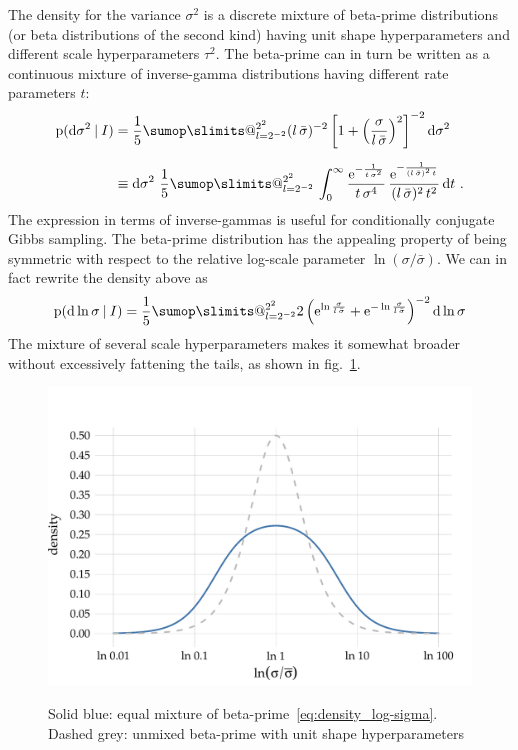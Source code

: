 \documentclass[\ifafour a4paper,12pt,\else a5paper,10pt,\fi%
onecolumn,oneside,article,%
british%
]{memoir}
\makeatletter
\theoremstyle{remark}
\theoremstyle{innote}
\def\sum{\DOTSI\sumop\slimits@}
\newcommand*{\e}{\ensuremath{\mathrm{e}}}
\newcommand*{\di}{\mathrm{d}}%
\newcommand*{\p}{\mathrm{p}}%
\renewcommand*{\|}[1][]{\nonscript\:#1\vert\nonscript\:\mathopen{}}
\newcommand*{\sect}{\S}%
\newcommand*{\fig}{fig.}%
\newcommand*{\sigmao}{\bar{\sigma}}
\makeatother
\begin{document}
\medskip

The density for the variance $\sigma^{2}$ is a discrete mixture of beta-prime distributions (or beta distributions of the second kind) \autocites[\sect\,25.7, 27.2]{johnsonetal1970b_r1995}{mcdonald1984} having unit shape hyperparameters and different scale hyperparameters $\tau^{2}$. The beta-prime can in turn be written as a continuous mixture of inverse-gamma distributions \autocites{dubey1970} having different rate parameters $t$:
\begin{equation}
  \label{eq:density_sigma}
  \begin{split}
    \p(\di\sigma^{2}\|I) &=
    \frac{1}{5}\sum_{l=2^{-2}}^{2^{2}}
    (l\,\sigmao)^{-2}\,\biggl[1+\Bigl(\frac{\sigma}{l\,\sigmao}\Bigr)^{2}\biggr]^{-2}
    \,\di\sigma^{2}
  \\[2\jot]
  &\equiv
    \di\sigma^{2}\ 
    \frac{1}{5}\sum_{l=2^{-2}}^{2^{2}}\,
    \int_{0}^{\infty}
    \frac{\e^{-\frac{1}{t\,\sigma^{2}}}}{
    t\,\sigma^{4}
  }\,
    \frac{\e^{-\frac{1}{(l\,\sigmao)^{2}\,t}}}{
    (l\,\sigmao)^{2}\,t^{2}
  }\,\di t \ .
\end{split}
\end{equation}
The expression in terms of inverse-gammas is useful for conditionally conjugate Gibbs sampling. The beta-prime distribution has the appealing property of being symmetric with respect to the relative log-scale parameter $\ln(\sigma/\sigmao)$. We can in fact rewrite the density above as
\begin{equation}
  \label{eq:density_log-sigma}
    \p(\di \ln\sigma\|I) =
    \frac{1}{5}\sum_{l=2^{-2}}^{2^{2}}
    2\,\Bigl(
    \e^{\ln\frac{\sigma}{l\,\sigmao}}
+    \e^{-\ln\frac{\sigma}{l\,\sigmao}}
    \Bigr)^{-2}\, \di\ln\sigma
\end{equation}
The mixture of several scale hyperparameters makes it somewhat broader without excessively fattening the tails, as shown in \fig~\ref{fig:betaprime}.
\begin{figure}
\centering\includegraphics[width=0.75\linewidth]{betaprime.pdf}\\
\caption{Solid blue: equal mixture of beta-prime~\eqref{eq:density_log-sigma}. Dashed grey: unmixed beta-prime with unit shape hyperparameters}\label{fig:betaprime}
\end{figure}
\end{document}
